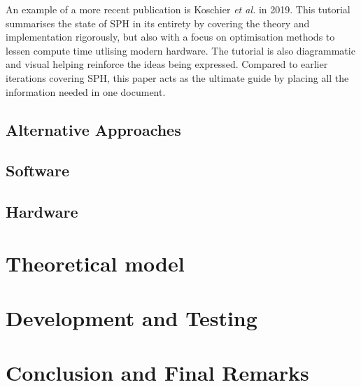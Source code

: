 \documentclass[a4paper,11pt]{article}
\begin{document}
\begin{multicols}{2}
An example of a more recent publication is Koschier \textit{et al.} \cite{koschier} in 2019. This tutorial summarises the state of SPH in its entirety by covering the theory and implementation rigorously, but also with a focus on optimisation methods to lessen compute time utlising modern hardware. The tutorial is also diagrammatic and visual helping reinforce the ideas being expressed. Compared to earlier iterations covering SPH, this paper acts as the ultimate guide by placing all the information needed in one document.%

\subsection{Alternative Approaches}
\subsection{Software}
\subsection{Hardware}
\section{Theoretical model}
\section{Development and Testing}
\section{Conclusion and Final Remarks}

\newpage
\nocite{*}


\end{multicols}
\end{document}
